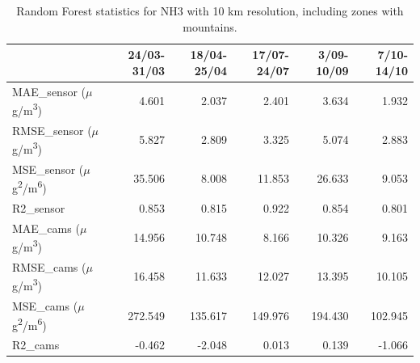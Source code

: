 \begin{table}[H]
\begin{tabular}{lrrrrr}
\toprule
  &  24/03-31/03 &  18/04-25/04 &  17/07-24/07 &  3/09-10/09 &  7/10-14/10 \\
\midrule
 MAE\_sensor ($\mu$g/m\textsuperscript{3})&        4.601 &        2.037 &        2.401 &       3.634 &       1.932 \\
RMSE\_sensor ($\mu$g/m\textsuperscript{3})&        5.827 &        2.809 &        3.325 &       5.074 &       2.883 \\
 MSE\_sensor ($\mu$g\textsuperscript{2}/m\textsuperscript{6})&       35.506 &        8.008 &       11.853 &      26.633 &       9.053 \\
  R2\_sensor &        0.853 &        0.815 &        0.922 &       0.854 &       0.801 \\
   MAE\_cams ($\mu$g/m\textsuperscript{3})&       14.956 &       10.748 &        8.166 &      10.326 &       9.163 \\
  RMSE\_cams ($\mu$g/m\textsuperscript{3})&       16.458 &       11.633 &       12.027 &      13.395 &      10.105 \\
   MSE\_cams ($\mu$g\textsuperscript{2}/m\textsuperscript{6})&      272.549 &      135.617 &      149.976 &     194.430 &     102.945 \\
    R2\_cams &       -0.462 &       -2.048 &        0.013 &       0.139 &      -1.066 \\
\bottomrule
\end{tabular}
\caption{Random Forest statistics for NH3 with 10 km resolution, including zones with mountains.}
\end{table}
